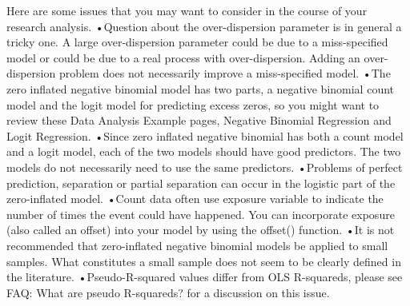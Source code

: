 Here are some issues that you may want to consider in the course of your research analysis.
 •Question about the over-dispersion parameter is in general a tricky one. A large over-dispersion parameter could be due to a miss-specified model or could be due to a real process with over-dispersion. Adding an over-dispersion problem does not necessarily improve a miss-specified model. 
•The zero inflated negative binomial model has two parts, a negative binomial count model and the logit model for predicting excess zeros, so you might want to review these Data Analysis Example pages, Negative Binomial Regression and Logit Regression. 
•Since zero inflated negative binomial has both a count model and a logit model, each of the two models should have good predictors. The two models do not necessarily need to use the same predictors. 
•Problems of perfect prediction, separation or partial separation can occur in the logistic part of the zero-inflated model. 
•Count data often use exposure variable to indicate the number of times the event could have happened. You can incorporate exposure (also called an offset) into your model by using the offset() function. 
•It is not recommended that zero-inflated negative binomial models be applied to small samples. What constitutes a small sample does not seem to be clearly defined in the literature. 
•Pseudo-R-squared values differ from OLS R-squareds, please see FAQ: What are pseudo R-squareds? for a discussion on this issue.
